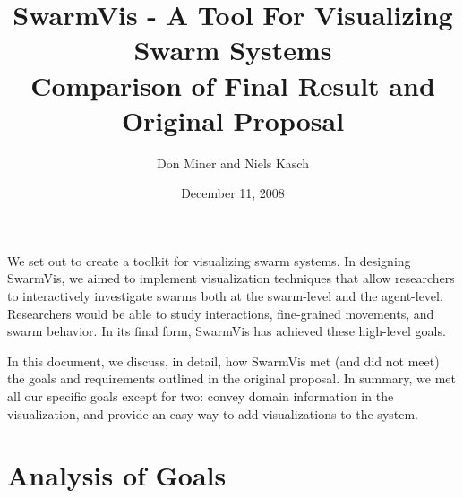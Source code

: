\documentclass{article}
\title{SwarmVis - A Tool For Visualizing Swarm Systems\\Comparison of Final Result and Original Proposal}
\author{Don Miner and Niels Kasch}
\date{December 11, 2008}
\begin{document}
\maketitle

We set out to create a toolkit for visualizing swarm systems. In designing SwarmVis, we aimed to implement visualization techniques that allow researchers to interactively investigate swarms both at the swarm-level and the agent-level.  Researchers would be able to study interactions, fine-grained movements, and swarm behavior. In its final form, SwarmVis has achieved these high-level goals.

In this document, we discuss, in detail, how SwarmVis met (and did not meet) the goals and requirements outlined in the original proposal.
In summary, we met all our specific goals except for two: convey domain information in the visualization, and provide an easy way to add visualizations to the system.

\section{Analysis of Goals}
\end{document}
